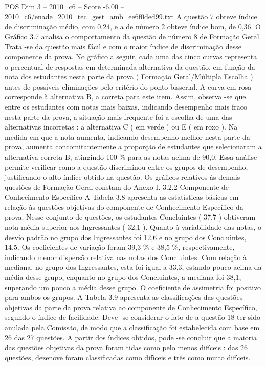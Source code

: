 \begin{textsample}{POS Dim 3 – 2010\_c6 – Score -6.00 – 2010\_c6/enade\_2010\_tec\_gest\_amb\_ee6f0ded99.txt}
A questão 7 obteve índice de discriminação médio, com 0,24, e a de número 2 obteve índice bom, de 0,36.
O Gráfico 3.7 analisa o comportamento da questão de número 8 de Formação Geral.
Trata -se da questão mais fácil e com o maior índice de discriminação desse componente da prova.
No gráfico a seguir, cada uma das cinco curvas representa o percentual de respostas em determinada alternativa da questão, em função da nota dos estudantes nesta parte da prova ( Formação Geral/Múltipla Escolha ) antes de possíveis eliminações pelo critério do ponto bisserial.
A curva em rosa corresponde à alternativa B, a correta para este item.
Assim, observa -se que entre os estudantes com notas mais baixas, indicando desempenho mais fraco nesta parte da prova, a situação mais frequente foi a escolha de uma das alternativas incorretas : a alternativa C ( em verde ) ou E ( em roxo ).
Na medida em que a nota aumenta, indicando desempenho melhor nesta parte da prova, aumenta concomitantemente a proporção de estudantes que selecionaram a alternativa correta B, atingindo 100 \% para as notas acima de 90,0.
Essa análise permite verificar como a questão discriminou entre os grupos de desempenho, justificando o alto índice obtido na questão.
Os gráficos relativos às demais questões de Formação Geral constam do Anexo I. 3.2.2 Componente de Conhecimento Específico A Tabela 3.8 apresenta as estatísticas básicas em relação às questões objetivas do componente de Conhecimento Específico da prova.
Nesse conjunto de questões, os estudantes Concluintes ( 37,7 ) obtiveram nota média superior aos Ingressantes ( 32,1 ).
Quanto à variabilidade das notas, o desvio padrão no grupo dos Ingressantes foi 12,6 e no grupo dos Concluintes, 14,5.
Os coeficientes de variação foram 39,3 \% e 38,5 \%, respectivamente, indicando menor dispersão relativa nas notas dos Concluintes.
Com relação à mediana, no grupo dos Ingressantes, esta foi igual a 33,3, estando pouco acima da média desse grupo, enquanto no grupo dos Concluintes, a mediana foi 38,1, superando um pouco a média desse grupo.
O coeficiente de assimetria foi positivo para ambos os grupos.
A Tabela 3.9 apresenta as classificações das questões objetivas da parte da prova relativa ao componente de Conhecimento Específico, segundo o índice de facilidade.
Deve -se considerar o fato de a questão 18 ter sido anulada pela Comissão, de modo que a classificação foi estabelecida com base em 26 das 27 questões.
A partir dos índices obtidos, pode -se concluir que a maioria das questões objetivas da prova foram tidas como pelo menos difíceis : das 26 questões, dezenove foram classificadas como difíceis e três como muito difíceis.

\end{textsample}
